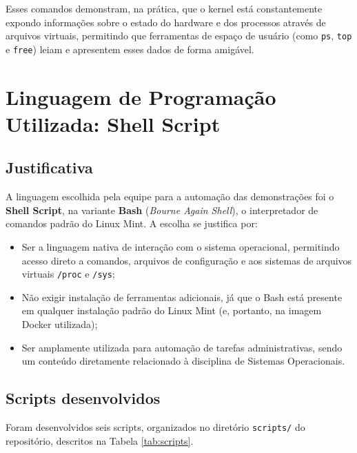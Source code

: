 \documentclass[a4paper,12pt]{article}
\begin{document}
Esses comandos demonstram, na prática, que o kernel está constantemente
expondo informações sobre o estado do hardware e dos processos através de
arquivos virtuais, permitindo que ferramentas de espaço de usuário (como
\texttt{ps}, \texttt{top} e \texttt{free}) leiam e apresentem esses dados de
forma amigável.


\section{Linguagem de Programação Utilizada: Shell Script}
\label{sec:scripts}

\subsection{Justificativa}

A linguagem escolhida pela equipe para a automação das demonstrações foi o
\textbf{Shell Script}, na variante \textbf{Bash} (\textit{Bourne Again
Shell}), o interpretador de comandos padrão do Linux Mint. A escolha se
justifica por:

\begin{itemize}
    \item Ser a linguagem nativa de interação com o sistema operacional,
          permitindo acesso direto a comandos, arquivos de configuração e
          aos sistemas de arquivos virtuais \texttt{/proc} e \texttt{/sys};
    \item Não exigir instalação de ferramentas adicionais, já que o Bash
          está presente em qualquer instalação padrão do Linux Mint
          (e, portanto, na imagem Docker utilizada);
    \item Ser amplamente utilizada para automação de tarefas
          administrativas, sendo um conteúdo diretamente relacionado à
          disciplina de Sistemas Operacionais.
\end{itemize}

\subsection{Scripts desenvolvidos}

Foram desenvolvidos seis scripts, organizados no diretório
\texttt{scripts/} do repositório, descritos na Tabela \ref{tab:scripts}.
\end{document}

